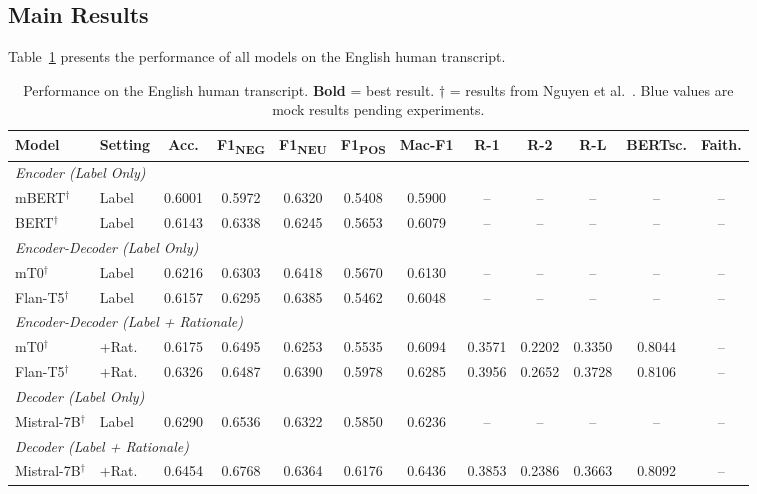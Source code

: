 \documentclass[conference]{IEEEtran}
\newcommand{\mock}[1]{{\color{blue}#1}}
\begin{document}
\subsection{Main Results}

Table~\ref{tab:main_results} presents the performance of all models on the English human transcript.

\begin{table}[t]
\centering
\caption{Performance on the English human transcript. \textbf{Bold} = best result. $\dagger$ = results from Nguyen et al.~\cite{nguyen2024sentiment}. \mock{Blue values} are mock results pending experiments.}
\label{tab:main_results}
\begin{tabular}{llcccccccccc}
\toprule
\textbf{Model} & \textbf{Setting} & \textbf{Acc.} & \textbf{F1\textsubscript{NEG}} & \textbf{F1\textsubscript{NEU}} & \textbf{F1\textsubscript{POS}} & \textbf{Mac-F1} & \textbf{R-1} & \textbf{R-2} & \textbf{R-L} & \textbf{BERTsc.} & \textbf{Faith.} \\
\midrule
\multicolumn{12}{l}{\textit{Encoder (Label Only)}} \\
mBERT$^\dagger$ & Label & 0.6001 & 0.5972 & 0.6320 & 0.5408 & 0.5900 & -- & -- & -- & -- & -- \\
BERT$^\dagger$ & Label & 0.6143 & 0.6338 & 0.6245 & 0.5653 & 0.6079 & -- & -- & -- & -- & -- \\
\midrule
\multicolumn{12}{l}{\textit{Encoder-Decoder (Label Only)}} \\
mT0$^\dagger$ & Label & 0.6216 & 0.6303 & 0.6418 & 0.5670 & 0.6130 & -- & -- & -- & -- & -- \\
Flan-T5$^\dagger$ & Label & 0.6157 & 0.6295 & 0.6385 & 0.5462 & 0.6048 & -- & -- & -- & -- & -- \\
\midrule
\multicolumn{12}{l}{\textit{Encoder-Decoder (Label + Rationale)}} \\
mT0$^\dagger$ & +Rat. & 0.6175 & 0.6495 & 0.6253 & 0.5535 & 0.6094 & 0.3571 & 0.2202 & 0.3350 & 0.8044 & -- \\
Flan-T5$^\dagger$ & +Rat. & 0.6326 & 0.6487 & 0.6390 & 0.5978 & 0.6285 & 0.3956 & 0.2652 & 0.3728 & 0.8106 & -- \\
\midrule
\multicolumn{12}{l}{\textit{Decoder (Label Only)}} \\
Mistral-7B$^\dagger$ & Label & 0.6290 & 0.6536 & 0.6322 & 0.5850 & 0.6236 & -- & -- & -- & -- & -- \\
\midrule
\multicolumn{12}{l}{\textit{Decoder (Label + Rationale)}} \\
Mistral-7B$^\dagger$ & +Rat. & 0.6454 & 0.6768 & 0.6364 & 0.6176 & 0.6436 & 0.3853 & 0.2386 & 0.3663 & 0.8092 & -- \\

\end{tabular}
\end{table}
\end{document}
